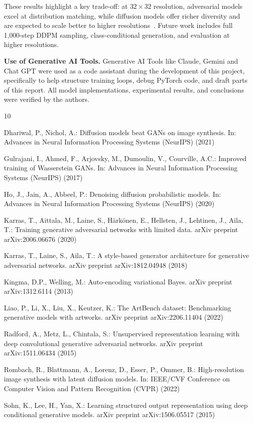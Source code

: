 \documentclass{llncs}
\begin{document}
These results highlight a key trade-off: at $32\times32$ resolution,
adversarial models excel at distribution matching, while diffusion models
offer richer diversity and are expected to scale better to higher
resolutions~\cite{rombach2022}. Future work includes full 1,000-step DDPM
sampling, class-conditional generation, and evaluation at higher resolutions.

\smallskip\noindent\textbf{Use of Generative AI Tools.}
Generative AI Tools like Claude, Gemini and
Chat GPT were used as a code assistant during the development of this project,
specifically to help structure training loops, debug PyTorch code, and draft parts
of this report. All model implementations, experimental results, and conclusions
were verified by the authors.

\begin{thebibliography}{10}

Dhariwal, P., Nichol, A.: Diffusion models beat GANs on image synthesis.
In: Advances in Neural Information Processing Systems (NeurIPS) (2021)

Gulrajani, I., Ahmed, F., Arjovsky, M., Dumoulin, V., Courville, A.C.:
Improved training of Wasserstein GANs.
In: Advances in Neural Information Processing Systems (NeurIPS) (2017)

Ho, J., Jain, A., Abbeel, P.: Denoising diffusion probabilistic models.
In: Advances in Neural Information Processing Systems (NeurIPS) (2020)

Karras, T., Aittala, M., Laine, S., H{\"a}rk{\"o}nen, E., Hellsten, J.,
Lehtinen, J., Aila, T.: Training generative adversarial networks with limited
data. arXiv preprint arXiv:2006.06676 (2020)

Karras, T., Laine, S., Aila, T.: A style-based generator architecture for
generative adversarial networks. arXiv preprint arXiv:1812.04948 (2018)

Kingma, D.P., Welling, M.: Auto-encoding variational Bayes.
arXiv preprint arXiv:1312.6114 (2013)

Liao, P., Li, X., Liu, X., Keutzer, K.: The ArtBench dataset: Benchmarking
generative models with artworks. arXiv preprint arXiv:2206.11404 (2022)

Radford, A., Metz, L., Chintala, S.: Unsupervised representation learning with
deep convolutional generative adversarial networks.
arXiv preprint arXiv:1511.06434 (2015)

Rombach, R., Blattmann, A., Lorenz, D., Esser, P., Ommer, B.:
High-resolution image synthesis with latent diffusion models.
In: IEEE/CVF Conference on Computer Vision and Pattern Recognition (CVPR) (2022)

Sohn, K., Lee, H., Yan, X.: Learning structured output representation using
deep conditional generative models.
arXiv preprint arXiv:1506.05517 (2015)

\end{thebibliography}
\end{document}
